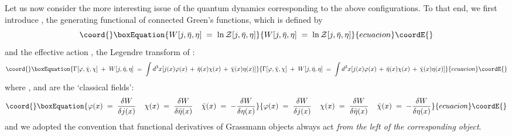 \documentclass[a4paper,12pt]{article}
\begin{document}
   
Let us now consider the more interesting issue of the quantum dynamics
corresponding to the above configurations. To that end, we first
introduce \coordHE{}, the generating functional of
connected Green's functions, which is defined by
\begin{equation}\coord{}\boxEquation{
  \label{eq:defw}
W[j,{\bar\eta},\eta] \;=\; \ln {\mathcal Z}[j,{\bar\eta},\eta]
}{
  W[j,{\bar\eta},\eta] \;=\; \ln {\mathcal Z}[j,{\bar\eta},\eta]
}{ecuacion}\coordE{}\end{equation}
and the effective action \myHighlight{$\Gamma$}\coordHE{}, the Legendre transform of \coordHE{}:
\begin{equation}\coord{}\boxEquation{
  \label{eq:defga}
\Gamma[\varphi,{\bar\chi},\chi]\;+\;W[j,{\bar\eta},\eta]\;=\; \int d^3x [j(x) \varphi(x) \,+\, {\bar\eta}(x) \chi(x) 
\,+\, {\bar\chi}(x) \eta (x) ]
}{
  \Gamma[\varphi,{\bar\chi},\chi]\;+\;W[j,{\bar\eta},\eta]\;=\; \int d^3x [j(x) \varphi(x) \,+\, {\bar\eta}(x) \chi(x) 
\,+\, {\bar\chi}(x) \eta (x) ]
}{ecuacion}\coordE{}\end{equation}
where \myHighlight{$\varphi$}\coordHE{}, \myHighlight{${\bar\chi}$}\coordHE{} and \myHighlight{$\chi$}\coordHE{} are the `classical fields':
\begin{equation}\coord{}\boxEquation{
  \label{eq:defclf}
\varphi(x) \;=\; \frac{\delta W}{\delta j(x)} 
\;\;\;\;
\chi(x) \;=\; \frac{\delta W}{\delta {\bar\eta}(x)} 
\;\;\;\;
{\bar\chi}(x) \;=\; - \frac{\delta W}{\delta\eta(x)} 
}{
  \varphi(x) \;=\; \frac{\delta W}{\delta j(x)} 
\;\;\;\;
\chi(x) \;=\; \frac{\delta W}{\delta {\bar\eta}(x)} 
\;\;\;\;
{\bar\chi}(x) \;=\; - \frac{\delta W}{\delta\eta(x)} 
}{ecuacion}\coordE{}\end{equation}
and we adopted the convention that functional derivatives of Grassmann
objects always act {\em from the left of the corresponding object}.
\end{document}

